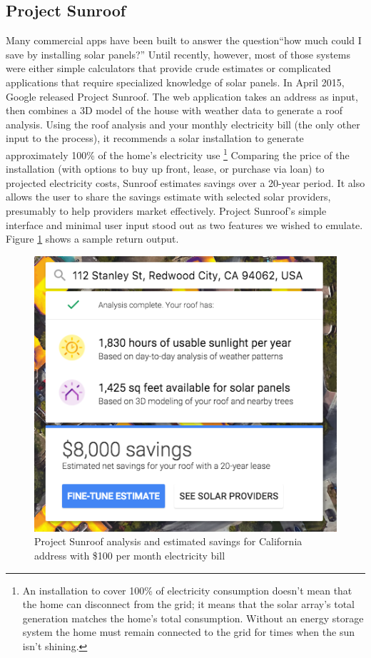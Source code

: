 \documentclass[pageno]{jpaper}
\begin{document}
\subsection{Project Sunroof}
Many commercial apps have been built to answer the question``how much could I save by installing solar panels?'' Until recently, however, most of those systems were either simple calculators that provide crude estimates or complicated applications that require specialized knowledge of solar panels. In April 2015, Google released Project Sunroof. The web application takes an address as input, then combines a 3D model of the house with weather data to generate a roof analysis. Using the roof analysis and your monthly electricity bill (the only other input to the process), it recommends a solar installation to generate approximately 100\% of the home's electricity use \footnote{An installation to cover 100\% of electricity consumption doesn't mean that the home can disconnect from the grid; it means that the solar array's total generation matches the home's total consumption. Without an energy storage system the home must remain connected to the grid for times when the sun isn't shining.} Comparing the price of the installation (with options to buy up front, lease, or purchase via loan) to projected electricity costs, Sunroof estimates savings over a 20-year period. It also allows the user to share the savings estimate with selected solar providers, presumably to help providers market effectively. Project Sunroof's simple interface and minimal user input stood out as two features we wished to emulate. Figure \ref{fig:sunroof} shows a sample return output.

\begin{figure}[h]
\begin{center}
\includegraphics[scale=0.5] {sunroof}
\caption{Project Sunroof analysis and estimated savings for California address with \$100 per month electricity bill}\label{fig:sunroof}
\end{center}
\end{figure}
\end{document}
